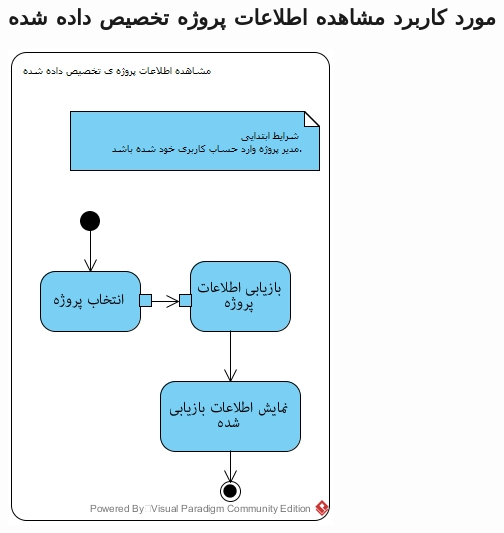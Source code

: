 \documentclass{article}
\begin{document}
\subsection*{مورد کاربرد مشاهده اطلاعات پروژه تخصیص داده شده}
\vspace{2cm}
\begin{center}
\includegraphics[width=\textwidth]{ActivityDiagrams/17.jpg}
\end{center}

\newpage
\vspace{2cm}
\end{document}

